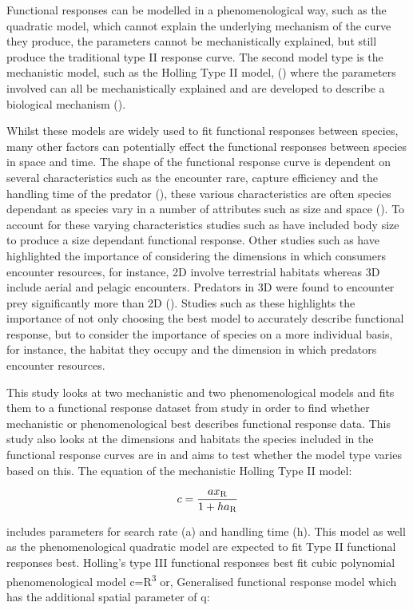 \documentclass[11pt]{article}
\begin{document}
Functional responses can be modelled in a phenomenological way, such as the quadratic model, which cannot explain the underlying mechanism of the curve they produce, the parameters cannot be mechanistically explained, but still produce the traditional type II response curve. The second model type is the mechanistic model, such as the Holling Type II model,  (\cite{Holling1959}) where the parameters involved can all be mechanistically explained and are developed to describe a biological mechanism (\cite{Jeschke2002}).

Whilst these models are widely used to fit functional responses between species, many other factors can potentially effect the functional responses between species in space and time. The shape of the functional response curve is dependent on several characteristics such as the encounter rare, capture efficiency and the handling time of the predator (\cite{Holling1965}), these various characteristics are often species dependant as species vary in a number of attributes such as size and space (\cite{Elliott2003}). To account for these varying characteristics studies such as \cite{Aljetlawi2004}  have included body size to produce a size dependant functional response. Other studies such as \cite{Pawar2012} have highlighted the importance of considering the dimensions in which consumers encounter resources, for instance, 2D involve terrestrial habitats whereas 3D include aerial and pelagic encounters. Predators in 3D were found to encounter prey significantly more than 2D (\cite{Pawar2012}). Studies such as these highlights the importance of not only choosing the best model to accurately describe functional response, but to consider the importance of species on a more individual basis, for instance, the habitat they occupy and the dimension in which predators encounter resources. 

This study looks at two mechanistic and two phenomenological models and fits them to a functional response dataset from \cite{Pawar2012} study in order to find whether mechanistic or phenomenological best describes functional response data. This study also looks at the dimensions and habitats the species included in the functional response curves are in and aims to test whether the model type varies based on this. The equation of the mechanistic Holling Type II model: 

$$c=\frac{ax\textsubscript{R}}{1+ha\textsubscript{R}}$$

includes parameters for search rate (a) and handling time (h). This model as well as the phenomenological quadratic model are expected to fit Type II functional responses best. Holling's type III functional responses best fit cubic polynomial phenomenological model c=R\textsuperscript{3} or, Generalised functional response model which has the additional spatial parameter of q:
\end{document}
